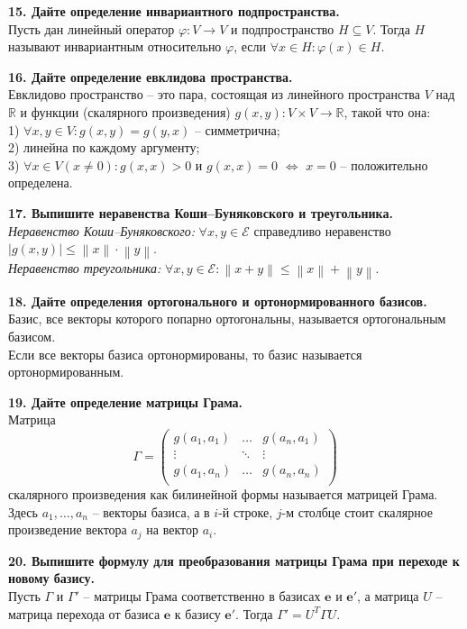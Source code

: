 \documentclass[11pt,a4paper]{article}
\newcommand{\R}{\mathbb{R}}
\newcommand{\e}{\mathbf{e}}
\newcommand{\eprime}{\mathbf{e'}}
\newcommand{\E}{\mathcal{E}}
\begin{document}
\textbf{15. Дайте определение инвариантного подпространства.\\}
Пусть дан линейный оператор $\varphi : V \rightarrow V$ и подпространство $H \subseteq V$. Тогда $H$ называют инвариантным относительно $\varphi$, если $\forall x \in H: \varphi(x) \in H$.

\textbf{16. Дайте определение евклидова пространства.\\}
Евклидово пространство -- это пара, состоящая из линейного пространства $V$ над $\R$ и функции (скалярного произведения) $g(x, y): V \times V \rightarrow \R$, такой что она:\\
1) $\forall x, y \in V: g(x, y) = g(y, x)$ -- симметрична;\\
2) линейна по каждому аргументу;\\
3) $\forall x \in V (x \neq 0): g(x, x) > 0$ и $g(x, x) = 0$ $\Leftrightarrow$ $x = 0$ -- положительно определена.

\textbf{17. Выпишите неравенства Коши--Буняковского и треугольника.\\}
\textit{Неравенство Коши--Буняковского:} $\forall x, y \in \E$ справедливо неравенство $\left\vert g(x, y) \right\vert \leq \left\| x \right\| \cdot \left\| y \right\|$.\\
\textit{Неравенство треугольника:} $\forall x, y \in \E: \left\| x + y \right\| \leq \left\| x \right\| + \left\| y \right\|$.

\textbf{18. Дайте определения ортогонального и ортонормированного базисов.\\}
Базис, все векторы которого попарно ортогональны, называется ортогональным базисом.\\
Если все векторы базиса ортонормированы, то базис называется ортонормированным.
\pagebreak

\textbf{19. Дайте определение матрицы Грама.\\}
Матрица
$$\Gamma = \left( \begin{matrix}
g(a_1, a_1) & \hdots & g(a_n, a_1) \\
\vdots & \ddots & \vdots \\
g(a_1, a_n) & \hdots & g(a_n, a_n) \\
\end{matrix} \right)$$
скалярного произведения как билинейной формы называется матрицей Грама. Здесь $a_1, \hdots, a_n$ -- векторы базиса, а в $i$-й строке, $j$-м столбце стоит скалярное произведение вектора $a_j$ на вектор $a_i$.

\textbf{20. Выпишите формулу для преобразования матрицы Грама при переходе к новому базису.\\}
Пусть $\Gamma$ и $\Gamma'$ -- матрицы Грама соответственно в базисах $\e$ и $\eprime$, а матрица $U$ -- матрица перехода от базиса $\e$ к базису $\eprime$. Тогда $\Gamma' = U^T \Gamma U$.
\end{document}
